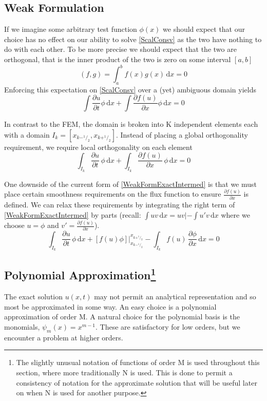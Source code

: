 \documentclass[letterpaper]{article}
\begin{document}
\subsection{Weak Formulation}
If we imagine some arbitrary test function $\phi(x)$ we should expect that our choice has no effect on our ability to solve \eqref{ScalConsv} as the two have nothing to do with each other. To be more precise we should expect that the two are orthogonal, that is the inner product of the two is zero on some interval $[a,b]$
	\begin{equation}\label{InnerProd}
	(f,g) = \int_a^b \! f(x)g(x) \, \mathrm{d}x = 0
	\end{equation}
Enforcing this expectation on \eqref{ScalConsv} over a (yet) ambiguous domain yields
	\begin{equation}\label{WeakFormGlobal}
	\int\! \frac{\partial u}{\partial t} \phi \,\mathrm{d}x + \int\! \frac{\partial f(u)}{\partial x} \phi \,\mathrm{d}x = 0
	\end{equation}

In contrast to the FEM, the domain is broken into K independent elements each with a domain $I_k =[x_{k-^1\!/_2},x_{k+^1\!/_2}]$. Instead of placing a global orthogonality requirement, we require local orthogonality on each element
	\begin{equation}\label{WeakFormExactIntermed}
	\int_{I_k}\! \frac{\partial u}{\partial t} \,\phi \,\mathrm{d}x + \int_{I_k}\! \frac{\partial f(u)}{\partial x} \,\phi \,\mathrm{d}x = 0
	\end{equation}

One downside of the current form of \eqref{WeakFormExactIntermed} is that we must place certain smoothness requirements on the flux function to ensure $\frac{\partial f(u)}{\partial x}$ is defined. We can relax these requirements by integrating the right term of \eqref{WeakFormExactIntermed} by parts (recall: $\int uv \,\mathrm{d}x = uv| - \int u'v \,\mathrm{d}x$ where we choose $u=\phi$ and $v'=\frac{\partial f(u)}{\partial x}$).
	\begin{equation}\label{WeakFormExact}
	\int_{I_k}\! \frac{\partial u}{\partial t} \,\phi \,\mathrm{d}x +
	[f(u)\phi] \Big\rvert_{x_{k-^1\!/_2}}^{x_{k+^1\!/_2}} -
	\int_{I_k}\! f(u) \,\frac{\partial \phi}{\partial x} \,\mathrm{d}x = 0
	\end{equation}

\subsection[Polynomial Approximation]
{Polynomial Approximation\footnote{The slightly unusual notation of functions of order M is used throughout this section, where more traditionally N is used. This is done to permit a consistency of notation for the approximate solution that will be useful later on when N is used for another purpose.} }
The exact solution $u(x,t)$ may not permit an analytical representation and so most be approximated in some way. An easy choice is a polynomial approximation of order M. A natural choice for the polynomial basis is the monomials, $\psi_m(x) = x^{m-1}$. These are satisfactory for low orders, but we encounter a problem at higher orders.
\end{document}
